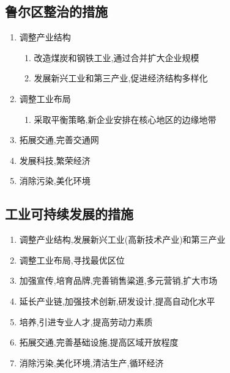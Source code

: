 \documentclass[a4paper]{article}
\begin{document}
    \subsection{鲁尔区整治的措施}
    \begin{enumerate}
        \item 调整产业结构
        \begin{enumerate}
            \item 改造煤炭和钢铁工业,通过合并扩大企业规模
            \item 发展新兴工业和第三产业,促进经济结构多样化
        \end{enumerate}
        \item 调整工业布局
        \begin{enumerate}
            \item 采取平衡策略,新企业安排在核心地区的边缘地带
        \end{enumerate}
        \item 拓展交通,完善交通网
        \item 发展科技,繁荣经济
        \item 消除污染,美化环境
    \end{enumerate}
    \subsection{工业可持续发展的措施}
    \begin{enumerate}
        \item 调整产业结构,发展新兴工业(高新技术产业)和第三产业
        \item 调整工业布局,寻找最优区位
        \item 加强宣传,培育品牌,完善销售粱道,多元营销,扩大市场
        \item 延长产业链,加强技术创新,研发设计,提高自动化水平
        \item 培养,引进专业人才,提高劳动力素质
        \item 拓展交通,完善基础设施,提高区域开放程度
        \item 消除污染,美化环境,清洁生产,循环经济
    \end{enumerate}
\end{document}
